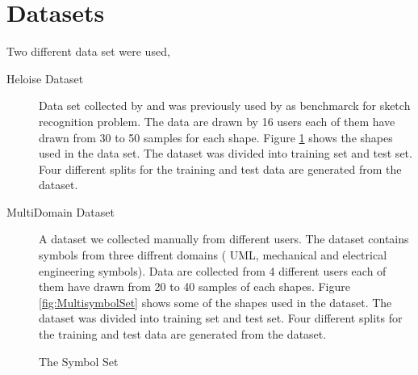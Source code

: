 \section{Datasets}
\label{sec:Datasets}
Two different data set were used, 
\begin{description}
	\item [Heloise Dataset] Data set collected by \cite{HeloiseBeautification} and was previously used by \cite{Oltmans07} as benchmarck for sketch recognition problem. The data are drawn by 16 users each of them have drawn from 30 to 50 samples for each shape. Figure \ref{fig:symbolSet} shows the shapes used in the data set. The dataset was divided into training set and test set. Four different splits for the training and test data are generated from the dataset. %
		\item [MultiDomain Dataset] A dataset we collected manually from different users. The dataset contains symbols from three diffrent domains ( UML, mechanical and electrical engineering symbols). Data are collected from 4 different users each of them have drawn from 20 to 40 samples of each shapes. Figure \ref{fig:MultisymbolSet} shows some of the shapes used in the dataset. The dataset was divided into training set and test set. Four different splits for the training and test data are generated from the dataset. %
\end{description}
\begin{figure}[]\centering
{}
	\caption{The Symbol Set}
	\label{fig:symbolSet}
\end{figure}

